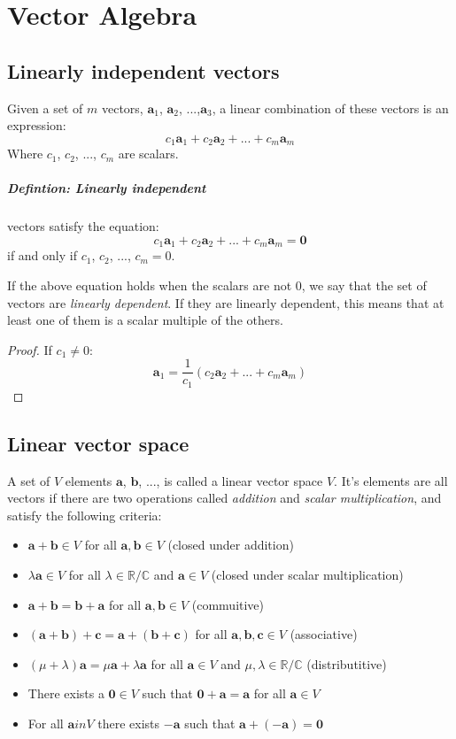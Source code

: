 \chapter{Vector Algebra}

\section{Linearly independent vectors}

Given a set of $m$ vectors, $\bm{a}_1$, $\bm{a}_2$, ...,$\bm{a}_3$, a linear
combination of these vectors is an expression:
$$
	c_1\bm{a}_1 + c_2\bm{a}_2 + ... + c_m\bm{a}_m
$$
Where $c_1$, $c_2$, ..., $c_m$ are scalars.

\paragraph{Defintion: Linearly independent} vectors satisfy the equation:
$$
	c_1\bm{a}_1 + c_2\bm{a}_2 + ... + c_m\bm{a}_m = \bm{0}
$$
if and only if $c_1$, $c_2$, ..., $c_m = 0$.
	
If the above equation holds when the scalars are not 0, we say that the set of
vectors are \emph{linearly dependent}. If they are linearly dependent, this
means that at least one of them is a scalar multiple of the others.
\begin{proof} 
If $c_1 \neq 0$:
$$
	\bm{a}_1 = \frac{1}{c_1}(c_2\bm{a}_2 + ... + c_m\bm{a}_m)
$$
\end{proof}

\section{Linear vector space}

A set of $V$ elements $\bm{a}$, $\bm{b}$, ..., is called a linear vector space
$V$. It's elements are all vectors if there are two operations called
\emph{addition} and \emph{scalar multiplication}, and satisfy the following
criteria:

\begin{itemize}
	\item $\bm{a} + \bm{b} \in V$ for all $\bm{a}, \bm{b} \in V$ (closed under
	addition)
	\item $\lambda\bm{a} \in V$ for all $\lambda \in \mathbb{R}/\mathbb{C}$ and
	$\bm{a} \in V$ (closed under scalar multiplication)
	\item $\bm{a} + \bm{b} = \bm{b} + \bm{a}$ for all $\bm{a}, \bm{b} \in V$ 
	(commuitive)
	\item $(\bm{a} + \bm{b}) + \bm{c} = \bm{a} + (\bm{b} + \bm{c})$ for all 
	$\bm{a}, \bm{b}, \bm{c} \in V$ (associative)
	\item $(\mu + \lambda)\bm{a} = \mu\bm{a} + \lambda\bm{a}$ for all $\bm{a}
	\in V$ and $\mu, \lambda \in \mathbb{R}/\mathbb{C}$ (distributitive)
	\item There exists a $\bm{0} \in V$ such that $\bm{0} + \bm{a} = \bm{a}$ for
	all $\bm{a} \in V$
	\item For all $\bm{a} in V$ there exists $-\bm{a}$ such that $\bm{a} + (-
	\bm{a}) = \bm{0}$
\end{itemize}

